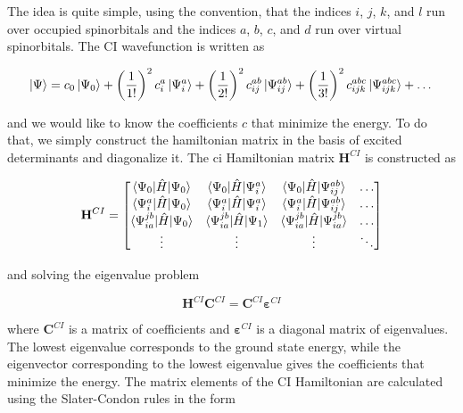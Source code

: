 \documentclass[open=any,parskip=half,11pt]{scrbook}
\begin{document}
The idea is quite simple, using the convention, that the indices \(i\), \(j\), \(k\), and \(l\) run over occupied spinorbitals and the indices \(a\), \(b\), \(c\), and \(d\) run over virtual spinorbitals. The CI wavefunction is written as

\begin{equation}
\ket{\Psi}=c_0\ket{\Psi_0}+\left(\frac{1}{1!}\right)^2c_i^a\ket{\Psi_i^a}+\left(\frac{1}{2!}\right)^2c_{ij}^{ab}\ket{\Psi_{ij}^{ab}}+\left(\frac{1}{3!}\right)^2c_{ijk}^{abc}\ket{\Psi_{ijk}^{abc}}+\dots
\end{equation}

and we would like to know the coefficients \(c\) that minimize the energy. To do that, we simply construct the hamiltonian matrix in the basis of excited determinants and diagonalize it. The \acrshort{ci} Hamiltonian matrix \(\mathbf{H}^{CI}\) is constructed as

\begin{equation}\label{eq:ci-hamiltonian}
\mathbf{H}^{CI}=
\begin{bmatrix}
\braket{\Psi_0|\hat{H}|\Psi_0} & \braket{\Psi_0|\hat{H}|\Psi_i^a} & \braket{\Psi_0|\hat{H}|\Psi_{ij}^{ab}} & \dots \\
\braket{\Psi_i^a|\hat{H}|\Psi_0} & \braket{\Psi_i^a|\hat{H}|\Psi_i^a} & \braket{\Psi_i^a|\hat{H}|\Psi_{ij}^{ab}} & \dots \\
\braket{\Psi_{ia}^{jb}|\hat{H}|\Psi_0} & \braket{\Psi_{ia}^{jb}|\hat{H}|\Psi_1} & \braket{\Psi_{ia}^{jb}|\hat{H}|\Psi_{ia}^{jb}} & \dots \\
\vdots & \vdots & \vdots & \ddots
\end{bmatrix}
\end{equation}

and solving the eigenvalue problem

\begin{equation}\label{eq:ci-eigenvalue-problem}
\mathbf{H}^{CI}\mathbf{C}^{CI}=\mathbf{C}^{CI}\mathbf{\varepsilon}^{CI}
\end{equation}

where \(\mathbf{C}^{CI}\) is a matrix of coefficients and \(\mathbf{\varepsilon}^{CI}\) is a diagonal matrix of eigenvalues. The lowest eigenvalue corresponds to the ground state energy, while the eigenvector corresponding to the lowest eigenvalue gives the coefficients that minimize the energy. The matrix elements of the CI Hamiltonian are calculated using the Slater-Condon rules in the form
\end{document}
